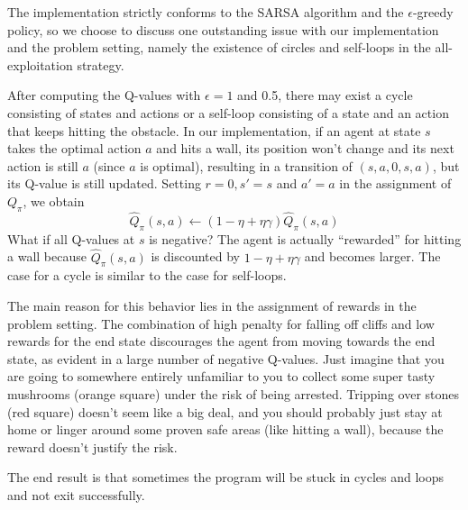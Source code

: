 \documentclass[a4paper]{article}
\begin{document}
The implementation strictly conforms to the SARSA algorithm and the
$\epsilon$-greedy policy, so we choose to discuss one outstanding issue with our
implementation and the problem setting, namely the existence of circles and
self-loops in the all-exploitation strategy.

After computing the Q-values with $\epsilon = 1$ and 0.5, there may exist a
cycle consisting of states and actions or a self-loop consisting of a state and
an action that keeps hitting the obstacle. In our implementation, if an agent at
state $s$ takes the optimal action $a$ and hits a wall, its position won't
change and its next action is still $a$ (since $a$ is optimal), resulting in a
transition of $(s, a, 0, s, a)$, but its Q-value is still updated. Setting $r =
0, s' = s$ and $a' = a$ in the assignment of $Q_\pi$, we obtain
\[
    \hat Q_\pi(s,a) \gets (1 - \eta + \eta\gamma) \hat Q_\pi(s,a)
\]
What if all Q-values at $s$ is negative? The agent is actually ``rewarded'' for
hitting a wall because $\hat{Q}_\pi(s, a)$ is discounted by $1 - \eta +
\eta\gamma$ and becomes larger. The case for a cycle is similar to the case for
self-loops.

The main reason for this behavior lies in the assignment of rewards in the
problem setting. The combination of high penalty for falling off cliffs and low
rewards for the end state discourages the agent from moving towards the end
state, as evident in a large number of negative Q-values. Just imagine that you
are going to somewhere entirely unfamiliar to you to collect some super tasty
mushrooms (orange square) under the risk of being arrested. Tripping over stones
(red square) doesn't seem like a big deal, and you should probably just stay at
home or linger around some proven safe areas (like hitting a wall), because the
reward doesn't justify the risk.

The end result is that sometimes the program will be stuck in cycles and loops
and not exit successfully.
\end{document}
